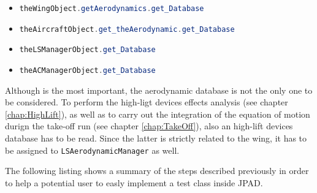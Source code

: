 %
\begin{itemize}
\item \lstinline[language=Java]!theWingObject.getAerodynamics.get_Database!
\item \lstinline[language=Java]!theAircraftObject.get_theAerodynamic.get_Database!
\item \lstinline[language=Java]!theLSManagerObject.get_Database!
\item \lstinline[language=Java]!theACManagerObject.get_Database!
\end{itemize}
%
Although is the most important, the aerodynamic database is not the only one to be considered. To perform the high-ligt devices effects analysis (see chapter \ref{chap:HighLift}), as well as to carry out the integration of the equation of motion durign the take-off run (see chapter \ref{chap:TakeOff}), also an high-lift devices database has to be read. Since the latter is strictly related to the wing, it has to be assigned to \lstinline[language=Java]!LSAerodynamicManager! as well.

\bigskip
\noindent
The following listing shows a summary of the steps described previously in order to help a potential user to easly implement a test class inside \gls{JPAD}.

